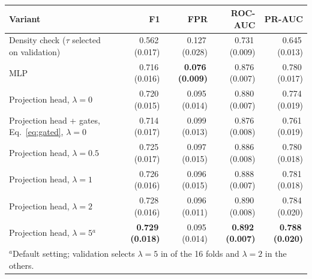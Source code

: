 \begin{table}[tb]
\centering
\caption{}
\label{tab:fusion}
\begin{tabular}{lrrrr}
\toprule
Variant & F1 & FPR & ROC-AUC & PR-AUC \\
\midrule
Density check ($\tau$ selected on validation) & 0.562\,(0.017) & 0.127\,(0.028) & 0.731\,(0.009) & 0.645\,(0.013) \\
MLP & 0.716\,(0.016) & \textbf{0.076\,(0.009)} & 0.876\,(0.007) & 0.780\,(0.017) \\
Projection head, $\lambda{=}0$ & 0.720\,(0.015) & 0.095\,(0.014) & 0.880\,(0.007) & 0.774\,(0.019) \\
Projection head + gates, Eq.~\eqref{eq:gated}, $\lambda{=}0$ & 0.714\,(0.017) & 0.099\,(0.013) & 0.876\,(0.008) & 0.761\,(0.019) \\
Projection head, $\lambda{=}0.5$ & 0.725\,(0.017) & 0.097\,(0.015) & 0.886\,(0.008) & 0.780\,(0.018) \\
Projection head, $\lambda{=}1$ & 0.726\,(0.016) & 0.096\,(0.015) & 0.888\,(0.007) & 0.781\,(0.018) \\
Projection head, $\lambda{=}2$ & 0.728\,(0.016) & 0.096\,(0.011) & 0.890\,(0.008) & 0.784\,(0.020) \\
Projection head, $\lambda{=}5$$^{a}$ & \textbf{0.729\,(0.018)} & 0.095\,(0.014) & \textbf{0.892\,(0.007)} & \textbf{0.788\,(0.020)} \\
\bottomrule
\multicolumn{5}{l}{\footnotesize $^{a}$Default setting; validation selects $\lambda{=}5$ in \nLamFive{} of the 16 folds and $\lambda{=}2$ in the others.}
\end{tabular}
\end{table}
